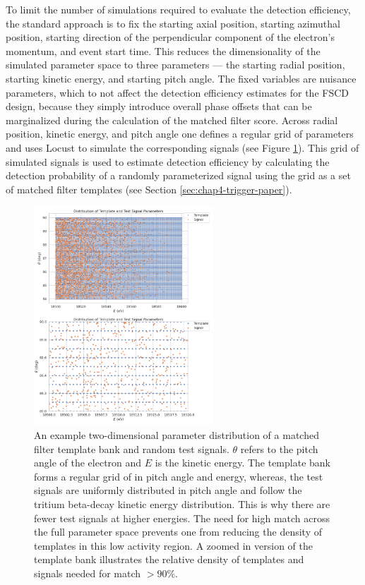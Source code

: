 To limit the number of simulations required to evaluate the detection efficiency, the standard approach is to fix the starting axial position, starting azimuthal position, starting direction of the perpendicular component of the electron's momentum, and event start time. This reduces the dimensionality of the simulated parameter space to three parameters --- the starting radial position, starting kinetic energy, and starting pitch angle. The fixed variables are nuisance parameters, which to not affect the detection efficiency estimates for the FSCD design, because they simply introduce overall phase offsets that can be marginalized during the calculation of the matched filter score. Across radial position, kinetic energy, and pitch angle one defines a regular grid of parameters and uses Locust to simulate the corresponding signals (see Figure \ref{fig:chap4-mf-parameter-grid}). This grid of simulated signals is used to estimate detection efficiency by calculating the detection probability of a randomly parameterized signal using the grid as a set of matched filter templates (see Section \ref{sec:chap4-trigger-paper}).

\begin{figure}[htbp]
    \centering
    \includegraphics*[width=0.6\textwidth]{figs/Chapter-4/230725_matched_filter_grid_example.png}
    \caption{\label{fig:chap4-mf-parameter-grid} An example two-dimensional parameter distribution of a matched filter template bank and random test signals. $\theta$ refers to the pitch angle of the electron and $E$ is the kinetic energy. The template bank forms a regular grid of in pitch angle and energy, whereas, the test signals are uniformly distributed in pitch angle and follow the tritium beta-decay kinetic energy distribution. This is why there are fewer test signals at higher energies. The need for high match across the full parameter space prevents one from reducing the density of templates in this low activity region. A zoomed in version of the template bank illustrates the relative density of templates and signals needed for match $>90\%$. }
\end{figure}

